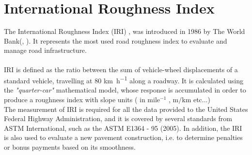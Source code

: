 \documentclass[tesi]{subfiles}
\begin{document}
	\chapter{International Roughness Index}
\label{ch:IRI}
The International Roughness Index (IRI) \cite{sayers1986guidelines}, was introduced in 1986 by The World Bank(\cite{sayers1986guidelines}, \cite{sayers1986international}). It represents the most used road roughness index to evaluate and manage road infrastructure. \\\\ \noindent IRI is defined as the ratio between the sum of vehicle-wheel displacements of a standard vehicle, travelling at \num{80} \si{\km\per\hour} along a roadway\cite{sayers1995calculation}. It is calculated using the \textit{"quarter-car"} mathematical model, whose response is accumulated in order to produce a roughness index\cite{little_book} with slope units ( in  mile$^{-1}$ , $\si{\meter\per\km}$  etc...) \\
The measurement of IRI is required for all the data provided to the United States Federal Highway Administration, and it is covered by several standards from ASTM International, such as the ASTM E1364 - 95 (2005)\cite{astm2}. In addition, the IRI is also used to evaluate a new pavement construction, i.e. to determine penalties or bonus payments based on its smoothness.
\end{document}
